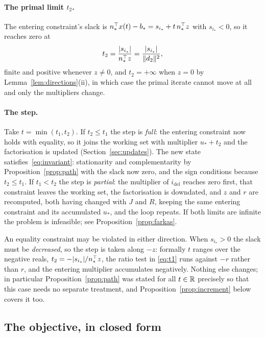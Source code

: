 \paragraph{The primal limit $t_2$.} The entering constraint's slack is
$n_*^{\top} x(t) - b_* = s_{i_*} + t\, n_*^{\top} z$ with $s_{i_*} < 0$, so it reaches zero
at
\begin{equation}
  t_2 = \frac{|s_{i_*}|}{n_*^{\top} z} = \frac{|s_{i_*}|}{\lVert d_2 \rVert^2},
  \label{eq:t2}
\end{equation}
finite and positive whenever $z \neq 0$, and $t_2 = +\infty$ when $z = 0$ by
Lemma~\ref{lem:directions}(ii), in which case the primal iterate cannot move at all
and only the multipliers change.

\paragraph{The step.} Take $t = \min(t_1,t_2)$. If $t_2 \le t_1$ the step is
\emph{full}: the entering constraint now holds with equality, so it joins the
working set with multiplier $u_* + t_2$ and the factorisation is updated
(Section~\ref{sec:updates}). The new state satisfies~\eqref{eq:invariant}:
stationarity and complementarity by Proposition~\ref{prop:path} with the slack now
zero, and the sign conditions because $t_2 \le t_1$. If $t_1 < t_2$ the step is
\emph{partial}: the multiplier of $i_{\mathrm{del}}$ reaches zero first, that
constraint leaves the working set, the factorisation is downdated, and $z$ and $r$
are recomputed, both having changed with $J$ and $R$, keeping the same
entering constraint and its accumulated $u_*$, and the loop repeats. If both
limits are infinite the problem is infeasible; see
Proposition~\ref{prop:farkas}.

\begin{remark}\label{rem:reverse}
An equality constraint may be violated in either direction. When $s_{i_*} > 0$
the slack must be \emph{decreased}, so the step is taken along $-z$: formally
$t$ ranges over the negative reals, $t_2 = -|s_{i_*}|/n_*^{\top} z$, the ratio test in
\eqref{eq:t1} runs against $-r$ rather than $r$, and the entering multiplier
accumulates negatively. Nothing else changes; in particular
Proposition~\ref{prop:path} was stated for all $t \in \mathbb{R}$ precisely so that this
case needs no separate treatment, and Proposition~\ref{prop:increment} below
covers it too.
\end{remark}

\subsection{The objective, in closed form}

